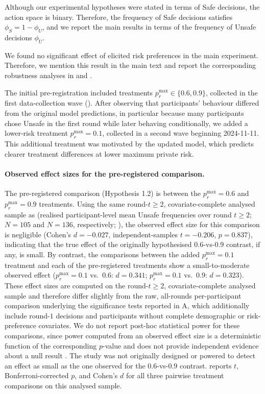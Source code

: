 \documentclass[pdflatex,sn-mathphys-ay]{sn-jnl}
\theoremstyle{thmstyleone}
\theoremstyle{thmstyletwo}
\theoremstyle{thmstylethree}
\begin{document}
Although our experimental hypotheses were stated in terms of Safe decisions, the action space is binary. Therefore, the frequency of Safe decisions satisfies \(\phi_S=1-\phi_U\), and we report the main results in terms of the frequency of Unsafe decisions \(\phi_U\).

We found no significant effect of elicited risk preferences in the main experiment. Therefore, we mention this result in the main text and report the corresponding robustness analyses in  and .

The initial pre-registration included treatments \(p_r^{\max}\in\{0.6,0.9\}\), collected in the first data-collection wave (). After observing that participants' behaviour differed from the original model predictions, in particular because many participants chose Unsafe in the first round while later behaving conditionally, we added a lower-risk treatment \(p_r^{\max}=0.1\), collected in a second wave beginning 2024-11-11. This additional treatment was motivated by the updated model, which predicts clearer treatment differences at lower maximum private risk.

\paragraph{Observed effect sizes for the pre-registered comparison.} The pre-registered comparison (Hypothesis 1.2) is between the \(p_r^{\max}=0.6\) and \(p_r^{\max}=0.9\) treatments. Using the same round-\(t\geq2\), covariate-complete analysed sample as  (realised participant-level mean Unsafe frequencies over round \(t\geq2\); \(N=105\) and \(N=136\), respectively; ), the observed effect size for this comparison is negligible (Cohen's \(d=-0.027\), independent-samples \(t=-0.206\), \(p=0.837\)), indicating that the true effect of the originally hypothesised \(0.6\)-vs-\(0.9\) contrast, if any, is small. By contrast, the comparisons between the added \(p_r^{\max}=0.1\) treatment and each of the pre-registered treatments show a small-to-moderate observed effect (\(p_r^{\max}=0.1\) vs.\ \(0.6\): \(d=0.341\); \(p_r^{\max}=0.1\) vs.\ \(0.9\): \(d=0.323\)). These effect sizes are computed on the round-\(t\geq2\), covariate-complete analysed sample and therefore differ slightly from the raw, all-rounds per-participant comparison underlying the significance tests reported in A, which additionally include round-\(1\) decisions and participants without complete demographic or risk-preference covariates. We do not report post-hoc statistical power for these comparisons, since power computed from an observed effect size is a deterministic function of the corresponding \(p\)-value and does not provide independent evidence about a null result \citep{hoenig2001abuse}. The study was not originally designed or powered to detect an effect as small as the one observed for the \(0.6\)-vs-\(0.9\) contrast.  reports \(t\), Bonferroni-corrected \(p\), and Cohen's \(d\) for all three pairwise treatment comparisons on this analysed sample.
\end{document}
